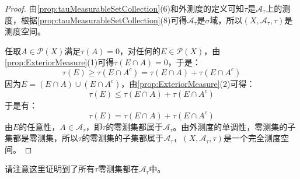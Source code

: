 \begin{proof}
	由\cref{prop:tauMeasurableSetCollection}(6)和外测度的定义可知$\tau$是$\mathscr{A}_{\tau}$上的测度，根据\cref{prop:tauMeasurableSetCollection}(8)可得$\mathscr{A}_\tau$是$\sigma$域，所以$(X,\mathscr{A}_\tau,\tau)$是测度空间。\par
	任取$A\in\mathscr{P}(X)$满足$\tau(A)=0$，对任何的$E\in\mathscr{P}(X)$，由\cref{prop:ExteriorMeasure}(1)可得$\tau(E\cap A)=0$，于是：
	\begin{equation*}
		\tau(E)\geqslant\tau(E\cap A^c)=\tau(E\cap A)+\tau(E\cap A^c)
	\end{equation*}
	因为$E=(E\cap A)\cup(E\cap A^c)$，由\cref{prop:ExteriorMeasure}(2)可得：
	\begin{equation*}
		\tau(E)\leqslant\tau(E\cap A)+\tau(E\cap A^c)
	\end{equation*}
	于是有：
	\begin{equation*}
		\tau(E)=\tau(E\cap A)+\tau(E\cap A^c)
	\end{equation*}
	由$E$的任意性，$A\in\mathscr{A}_{\tau}$，即$\tau$的零测集都属于$\mathscr{A}_{\tau}$。由外测度的单调性，零测集的子集都是零测集，所以$\tau$的零测集的子集都属于$\mathscr{A}_{\tau}$，$(X,\mathscr{A}_{\tau},\tau)$是一个完全测度空间。
\end{proof}
\begin{note}
	请注意这里证明到了所有$\tau$零测集都在$\mathscr{A}_\tau$中。
\end{note}

